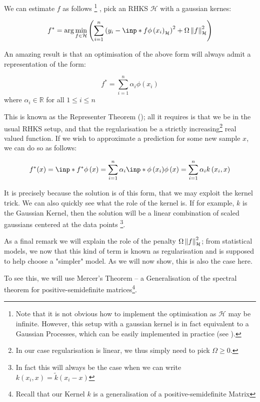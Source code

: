 We can estimate $f$ as follows
\footnote{Note that it is not obvious how to implement the optimisation as $\mathcal{H}$ may be infinite. However,
this setup with a gaussian kernel is in fact equivalent to a Gaussian Processes, which can be easily
implemented in practice (see \cite{JordanNotes}).}
, pick an RHKS $\mathcal{H}$ with a gaussian kernes:

\begin{equation}
    f^{*}=\arg \min _{f \in \mathcal{H}}\left(
        \sum_{i=1}^{n} 
        \left(y_{i} - \inp*{f}{\phi\left(x_{i}\right)}_{\mathcal{H}} \right)^{2}
        + \Omega \norm{f}_{\mathcal{H}}^{2}\right)
\end{equation}

An amazing result is that an optimisation of the above form will always admit a representation of the
form:

\[
    f^{*} = \sum_{i=1}^{n} \alpha_{i} \phi\left(x_{i}\right)
\]
where $\alpha_{i} \in \mathbb{R}$ for all $1 \leq i \leq n$

This is known as the Representer Theorem (\cite{scholkopf2001generalized}); all it requires is that we be in the usual RHKS setup, and that
the regularisation be a strictly increasing\footnote{In our case regularisation is linear,
we thus simply need to pick $\Omega \geq 0$.} real valued function.
If we wish to approximate a prediction for some new sample $x$, we can do so as follows:


$$
    f^{*}(x) = \inp*{f^{*}}{\phi\left(x\right)} = 
    \sum_{i=1}^{n} \alpha_{i} \inp*{\phi\left(x_i\right)}{\phi\left(x\right)} =
    \sum_{i=1}^{n} \alpha_{i} k\left(x_i, x\right)
$$

It is precisely because the solution is of this form, that we may exploit the kernel trick. We can
also quickly see what the role of the kernel is. If for example, $k$ is the Gaussian Kernel, then
the solution will be a linear combination of scaled gaussians centered at the data points
\footnote{In fact this will always be the case when we can write $k\left(x_i, x\right) = \tilde{k}\left(x_i - x\right)$}. 

As a final remark we will explain the role of the penalty $\Omega \left\lVert f\right\rVert_{\mathcal{H}}^{2}$; from 
statistical models, we now that this kind of term is known as regularisation and is supposed to help 
choose a "simpler" model. As we will now show, this is also the case here.

To see this, we will use Mercer's Theorem -- a Generalisation of the spectral theorem for positive-semidefinite
matrices\footnote{Recall that our Kernel $k$ is a generalisation of a positive-semidefinite Matrix}.

